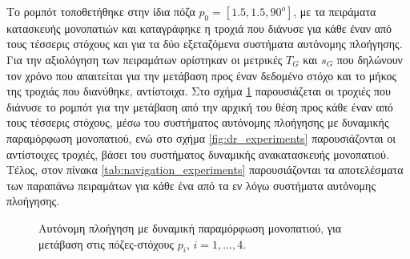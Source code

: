 \bigskip
Το ρομπότ τοποθετήθηκε στην ίδια πόζα $p_0=[1.5, 1.5, 90^o]$, με τα πειράματα κατασκευής μονοπατιών και καταγράφηκε η τροχιά που διάνυσε για κάθε έναν από τους τέσσερις στόχους και για τα δύο εξεταζόμενα συστήματα αυτόνομης πλοήγησης. Για την αξιολόγηση των πειραμάτων ορίστηκαν οι μετρικές $T_G$ και $s_G$ που δηλώνουν τον χρόνο που απαιτείται για την μετάβαση προς έναν δεδομένο στόχο και το μήκος της τροχιάς που διανύθηκε, αντίστοιχα. Στο σχήμα \ref{fig:dpm_experiments} παρουσιάζεται οι τροχιές που διάνυσε το ρομπότ για την μετάβαση από την αρχική του θέση προς κάθε έναν από τους τέσσερις στόχους, μέσω του συστήματος αυτόνομης πλοήγησης με δυναμικής παραμόρφωση μονοπατιού, ενώ στο σχήμα \ref{fig:dr_experiments} παρουσιάζονται οι αντίστοιχες τροχιές, βάσει του συστήματος δυναμικής ανακατασκευής μονοπατιού. Τέλος, στον πίνακα \ref{tab:navigation_experiments} παρουσιάζονται τα αποτελέσματα των παραπάνω πειραμάτων για κάθε ένα από τα εν λόγω συστήματα αυτόνομης πλοήγησης.

\begin{figure}[!ht]
	\centering
	 \vspace{0.01\linewidth}
	 \vspace{0.01\linewidth}
 	 \vspace{0.01\linewidth}
	\caption{Αυτόνομη πλοήγηση με  δυναμική παραμόρφωση μονοπατιού, για μετάβαση στις πόζες-στόχους $p_i$, $i=1,...,4$.}
	\label{fig:dpm_experiments}
\end{figure}


